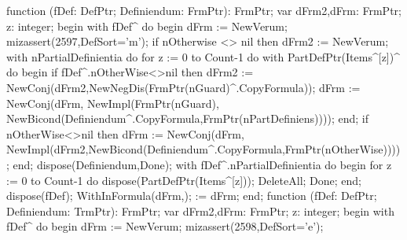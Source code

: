 \nwenddocs{}\endmoddef\nwstartdeflinemarkup{}\nwenddeflinemarkup
function (fDef: DefPtr;
                 Definiendum: FrmPtr): FrmPtr;
var
   dFrm2,dFrm: FrmPtr;
   z: integer;
begin
   with fDef^ do
   begin
      dFrm := NewVerum;
      mizassert(2597,DefSort='m');
      if nOtherwise <> nil then dFrm2 := NewVerum;
      with nPartialDefinientia do
         for z := 0 to Count-1 do
            with PartDefPtr(Items^[z])^ do
         begin
            if fDef^.nOtherWise<>nil then
               dFrm2 := NewConj(dFrm2,NewNegDis(FrmPtr(nGuard)^.CopyFormula));
            dFrm := NewConj(dFrm,
                            NewImpl(FrmPtr(nGuard),
                                    NewBicond(Definiendum^.CopyFormula,FrmPtr(nPartDefiniens))));
         end;
      if nOtherWise<>nil then
         dFrm := NewConj(dFrm,
                         NewImpl(dFrm2,NewBicond(Definiendum^.CopyFormula,FrmPtr(nOtherWise))));
   end;
   dispose(Definiendum,Done);
   with fDef^.nPartialDefinientia do
   begin
      for z := 0 to Count-1 do dispose(PartDefPtr(Items^[z]));
      DeleteAll; Done;
   end;
   dispose(fDef);
   WithInFormula(dFrm,);
    := dFrm;
end;
\eatline
{}\nwendcode{}\nwdocspar
\nwenddocs{}\endmoddef\nwstartdeflinemarkup{}\nwenddeflinemarkup
function (fDef: DefPtr;
                   Definiendum: TrmPtr): FrmPtr;
var
   dFrm2,dFrm: FrmPtr;
   z: integer;
begin
   with fDef^ do
   begin
      dFrm := NewVerum;
      mizassert(2598,DefSort='e');
